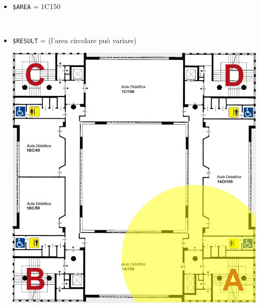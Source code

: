 \documentclass[../../Sperimentazione.tex]{subfiles}
\begin{document}
			\begin{tcolorbox}[fonttitle=\bfseries, 
								adjusted title={\Large Prova 10A.1}, 
								breakable, 
								sharp corners=south,
								colback=white, 
								colframe=white!60!black]
								
				\begin{description}[leftmargin=0.7cm,labelwidth=!]
				
					\item[Input] \ \par 
        				\begin{itemize}
        					\item \verb|$AREA| = 1C150
        				\end{itemize}
        				
        			\tcbline 
        				
        			\item[Output atteso] \ \par
        				\begin{itemize}
        					\item \verb|$RESULT| = (l'area circolare può variare)
        					\begin{center}
        						\includegraphics[scale=0.3]{img/ResultProva10A}
        					\end{center}
        				\end{itemize}


\end{description}
\end{tcolorbox}
\end{document}
